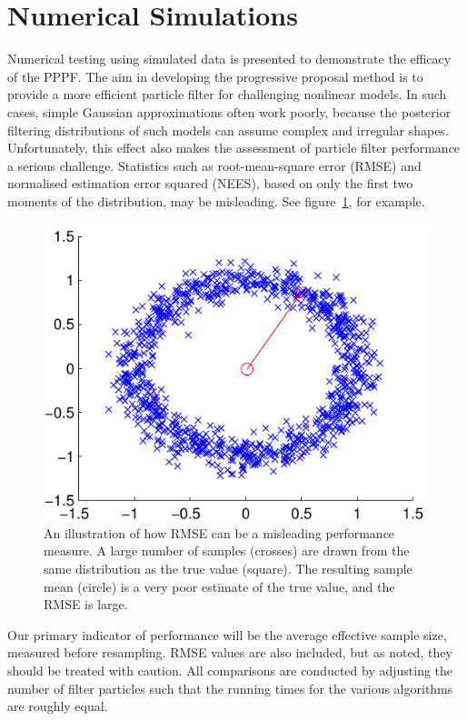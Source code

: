 \documentclass{article}
\begin{document}
\section{Numerical Simulations}

Numerical testing using simulated data is presented to demonstrate the efficacy of the PPPF. The aim in developing the progressive proposal method is to provide a more efficient particle filter for challenging nonlinear models. In such cases, simple Gaussian approximations often work poorly, because the posterior filtering distributions of such models can assume complex and irregular shapes. Unfortunately, this effect also makes the assessment of particle filter performance a serious challenge. Statistics such as root-mean-square error (RMSE) and normalised estimation error squared (NEES), based on only the first two moments of the distribution, may be misleading. See figure~\ref{fig:rmse_fail}, for example.
%
\begin{figure}
\centering
\includegraphics[width=0.7\columnwidth]{rmse_fail.pdf}
\caption{An illustration of how RMSE can be a misleading performance measure. A large number of samples (crosses) are drawn from the same distribution as the true value (square). The resulting sample mean (circle) is a very poor estimate of the true value, and the RMSE is large.}
\label{fig:rmse_fail}
\end{figure}

Our primary indicator of performance will be the average effective sample size, measured before resampling. RMSE values are also included, but as noted, they should be treated with caution. All comparisons are conducted by adjusting the number of filter particles such that the running times for the various algorithms are roughly equal.
\end{document}
